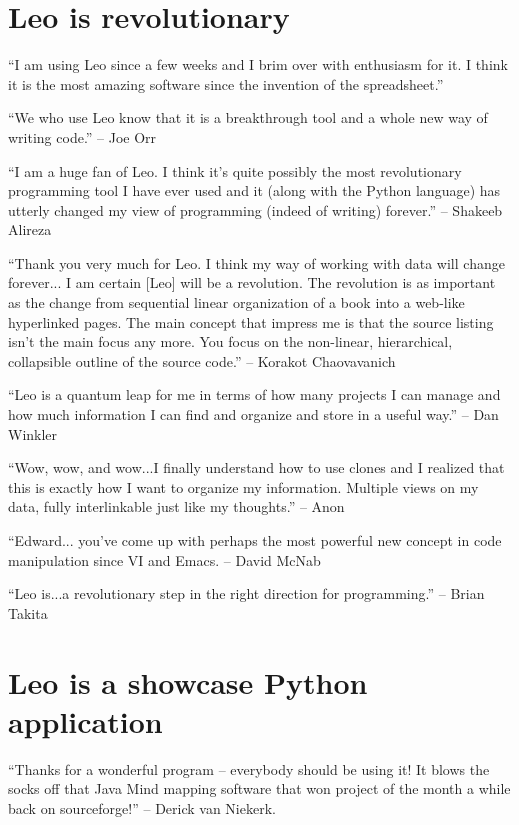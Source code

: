 \documentclass[a4paper,10pt,english]{sphinxmanual}
\begin{document}

\section{Leo is revolutionary}
\label{testimonials:leo-is-revolutionary}\label{testimonials:toc}
``I am using Leo since a few weeks and I brim over with enthusiasm for it. I
think it is the most amazing software since the invention of the spreadsheet.''

``We who use Leo know that it is a breakthrough tool and a whole new way of
writing code.'' -- Joe Orr

``I am a huge fan of Leo. I think it's quite possibly the most revolutionary
programming tool I have ever used and it (along with the Python language) has
utterly changed my view of programming (indeed of writing) forever.'' -- Shakeeb
Alireza

``Thank you very much for Leo. I think my way of working with data will change
forever... I am certain {[}Leo{]} will be a revolution. The revolution is as
important as the change from sequential linear organization of a book into a
web-like hyperlinked pages. The main concept that impress me is that the source
listing isn't the main focus any more. You focus on the non-linear,
hierarchical, collapsible outline of the source code.'' -- Korakot Chaovavanich

``Leo is a quantum leap for me in terms of how many projects I can manage and how
much information I can find and organize and store in a useful way.'' -- Dan
Winkler

``Wow, wow, and wow...I finally understand how to use clones and I realized that
this is exactly how I want to organize my information. Multiple views on my
data, fully interlinkable just like my thoughts.'' -- Anon

``Edward... you've come up with perhaps the most powerful new concept in code
manipulation since VI and Emacs. -- David McNab

``Leo is...a revolutionary step in the right direction for programming.'' -- Brian
Takita


\section{Leo is a showcase Python application}
\label{testimonials:leo-is-a-showcase-python-application}
``Thanks for a wonderful program – everybody should be using it! It blows the
socks off that Java Mind mapping software that won project of the month a while
back on sourceforge!'' -- Derick van Niekerk.
\end{document}
